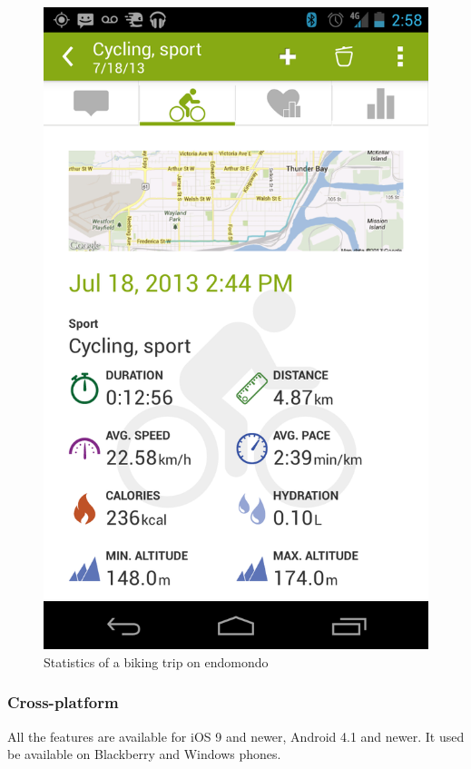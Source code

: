 \begin{figure}[h]
    \includegraphics[width=\textwidth]{Images/endomondo-bike-stats.png}
    \caption{Statistics of a biking trip on endomondo\cite{endomondo-bike-stats-img}}
\end{figure}

\subsubsection*{Cross-platform}
All the features are available for iOS 9 and newer, Android 4.1 and newer.
It used be available on Blackberry and Windows phones.
